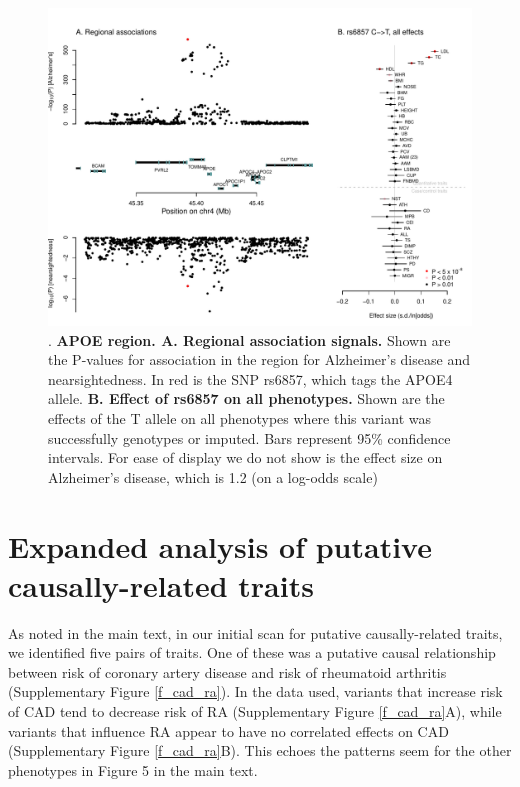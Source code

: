\documentclass[11pt,titlepage]{article}
\begin{document}
\begin{figure}
\begin{center}
\includegraphics[scale = 0.6]{figs/APOE_region.pdf}
\caption{. \textbf{APOE region. A. Regional association signals.} Shown are the P-values for association in the region for Alzheimer's disease and nearsightedness. In red is the SNP rs6857, which tags the APOE4 allele. \textbf{B. Effect of rs6857 on all phenotypes.} Shown are the effects of the T allele on all phenotypes where this variant was successfully genotypes or imputed. Bars represent 95\% confidence intervals. For ease of display we do not show is the effect size on Alzheimer's disease, which is 1.2 (on a log-odds scale)}\label{f_apoe}
\end{center}
\end{figure}


\section{Expanded analysis of putative causally-related traits}
As noted in the main text, in our initial scan for putative causally-related traits, we identified five pairs of traits. One of these was a putative causal relationship between risk of coronary artery disease and risk of rheumatoid arthritis (Supplementary Figure \ref{f_cad_ra}). In the data used, variants that increase risk of CAD tend to decrease risk of RA (Supplementary Figure \ref{f_cad_ra}A), while variants that influence RA appear to have no correlated effects on CAD (Supplementary Figure \ref{f_cad_ra}B). This echoes the patterns seem for the other phenotypes in Figure 5 in the main text. 
\end{document}
